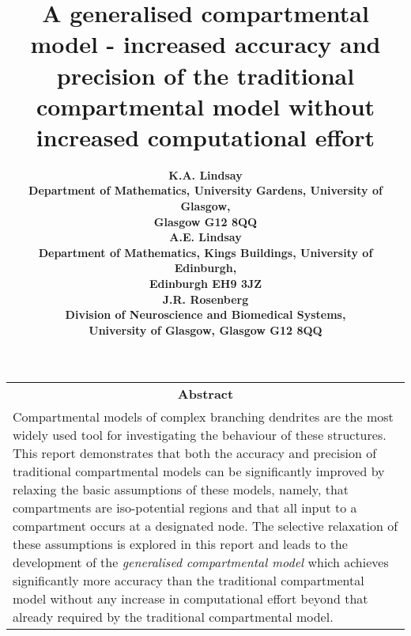 \documentclass[11pt]{article}
\title{\bf A generalised compartmental model - increased
accuracy and precision of the traditional compartmental model
without increased computational effort}
\author{\Large\bf K.A. Lindsay\\
Department of Mathematics, University Gardens, University of Glasgow,\\
Glasgow G12 8QQ\\[10pt]
\Large\bf A.E. Lindsay\\
Department of Mathematics, Kings Buildings, University of Edinburgh,\\
Edinburgh EH9 3JZ\\[10pt]
\Large\bf J.R. Rosenberg \\
Division of Neuroscience and Biomedical Systems,\\
University of Glasgow, Glasgow G12 8QQ}
\begin{document}

\maketitle
\thispagestyle{empty}

\vfil

\begin{center}
\begin{tabular}{p{5.2in}}
\multicolumn{1}{c}{\textbf{Abstract}}\\[10pt]

Compartmental models of complex branching dendrites are the most
widely used tool for investigating the behaviour of these
structures. This report demonstrates that both the accuracy and
precision of traditional compartmental models can be significantly
improved by relaxing the basic assumptions of these models,
namely, that compartments are iso-potential regions and that all
input to a compartment occurs at a designated node. The selective
relaxation of these assumptions is explored in this report and
leads to the development of the \emph{generalised compartmental
model} which achieves significantly more accuracy than the
traditional compartmental model without any increase in
computational effort beyond that already required by the
traditional compartmental model.
\end{tabular}
\end{center}

\vfil

\pagebreak[4]

\tableofcontents

\pagebreak[4]








\closegraphsfile
\end{document}
